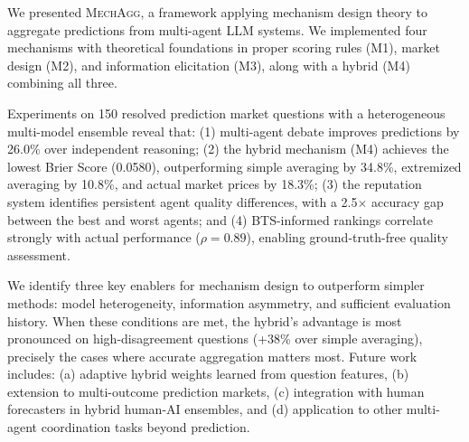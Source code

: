 \documentclass[conference]{IEEEtran}
\newcommand{\method}{\textsc{MechAgg}}
\begin{document}
We presented \method{}, a framework applying mechanism design theory to aggregate predictions from multi-agent LLM systems. We implemented four mechanisms with theoretical foundations in proper scoring rules (M1), market design (M2), and information elicitation (M3), along with a hybrid (M4) combining all three.

Experiments on 150 resolved prediction market questions with a heterogeneous multi-model ensemble reveal that: (1) multi-agent debate improves predictions by 26.0\% over independent reasoning; (2) the hybrid mechanism (M4) achieves the lowest Brier Score (0.0580), outperforming simple averaging by 34.8\%, extremized averaging by 10.8\%, and actual market prices by 18.3\%; (3) the reputation system identifies persistent agent quality differences, with a 2.5$\times$ accuracy gap between the best and worst agents; and (4) BTS-informed rankings correlate strongly with actual performance ($\rho = 0.89$), enabling ground-truth-free quality assessment.

We identify three key enablers for mechanism design to outperform simpler methods: model heterogeneity, information asymmetry, and sufficient evaluation history. When these conditions are met, the hybrid's advantage is most pronounced on high-disagreement questions (+38\% over simple averaging), precisely the cases where accurate aggregation matters most. Future work includes: (a) adaptive hybrid weights learned from question features, (b) extension to multi-outcome prediction markets, (c) integration with human forecasters in hybrid human-AI ensembles, and (d) application to other multi-agent coordination tasks beyond prediction.




\end{document}

